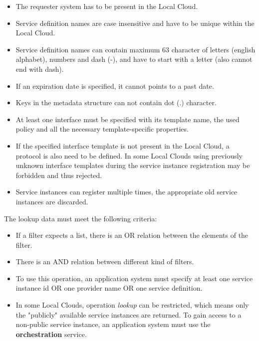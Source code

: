 \documentclass[a4paper]{arrowhead}
\begin{document}
\begin{itemize}
    \item The requester system has to be present in the Local Cloud.
    \item Service definition names are case insensitive and have to be unique within the Local Cloud.
    \item Service definition names can contain maximum 63 character of letters (english alphabet), numbers and dash (-), and have to start with a letter (also cannot end with dash).
    \item If an expiration date is specified, it cannot points to a past date.
    \item Keys in the metadata structure can not contain dot (.) character.
    \item At least one interface must be specified with its template name, the used policy and all the necessary template-specific properties.
    \item If the specified interface template is not present in the Local Cloud, a protocol is also need to be defined. In some Local Clouds using previously unknown interface templates during the service instance registration may be forbidden and thus rejected.
    \item Service instances can register multiple times, the appropriate old service instances are discarded.
\end{itemize}


The lookup data must meet the following criteria:

\begin{itemize}
    \item If a filter expects a list, there is an OR relation between the elements of the filter.
    \item There is an AND relation between different kind of filters.
    \item To use this operation, an application system must specify at least one service instance id OR one provider name OR one service definition.
    \item In some Local Clouds, operation \textit{lookup} can be restricted, which means only the "publicly" available service instances are returned. To gain access to a non-public service instance, an application system must use the \textbf{orchestration} service.
\end{itemize}
\end{document}
